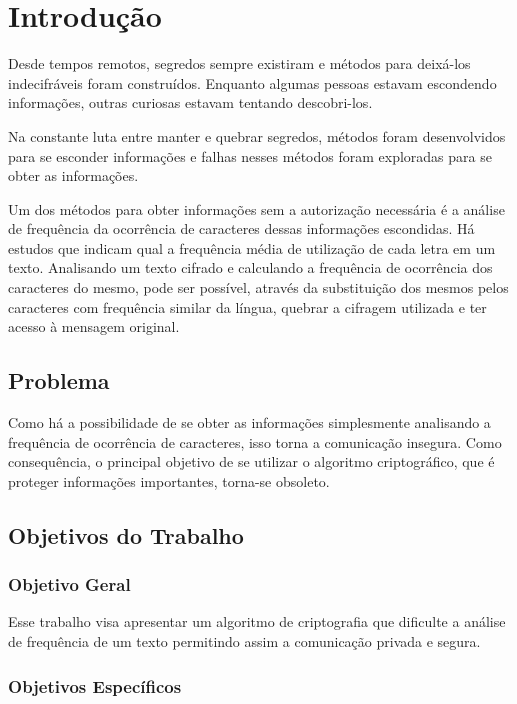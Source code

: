 \chapter{Introdução}
\label{introduction}

Desde tempos remotos, segredos sempre existiram e métodos para deixá-los indecifráveis foram construídos. Enquanto algumas pessoas estavam escondendo informações, outras curiosas estavam tentando descobri-los. ~\cite{alexander-maximov} %

Na constante luta entre manter e quebrar segredos, métodos foram desenvolvidos para se esconder informações e falhas nesses métodos foram exploradas para se obter as informações. 

Um dos métodos para obter informações sem a autorização necessária é a análise de frequência da ocorrência de caracteres dessas informações escondidas. Há estudos que indicam qual a frequência média de utilização de cada letra em um texto. Analisando um texto cifrado e calculando a frequência de ocorrência dos caracteres do mesmo, pode ser possível, através da substituição dos mesmos pelos caracteres com frequência similar da língua, quebrar a cifragem utilizada e ter acesso à mensagem original.

\section{Problema}

Como há a possibilidade de se obter as informações simplesmente analisando a frequência de ocorrência de caracteres, isso torna a comunicação insegura. Como consequência, o principal objetivo de se utilizar o algoritmo criptográfico, que é proteger informações importantes, torna-se obsoleto.  

\section{Objetivos do Trabalho}
\label{paper-objectives}

\subsection{Objetivo Geral}
\label{general-objective}
Esse trabalho visa apresentar um algoritmo de criptografia que dificulte a análise de frequência de um texto permitindo assim a comunicação privada e segura.

\subsection{Objetivos Específicos}
\label{specifics-objectives}

